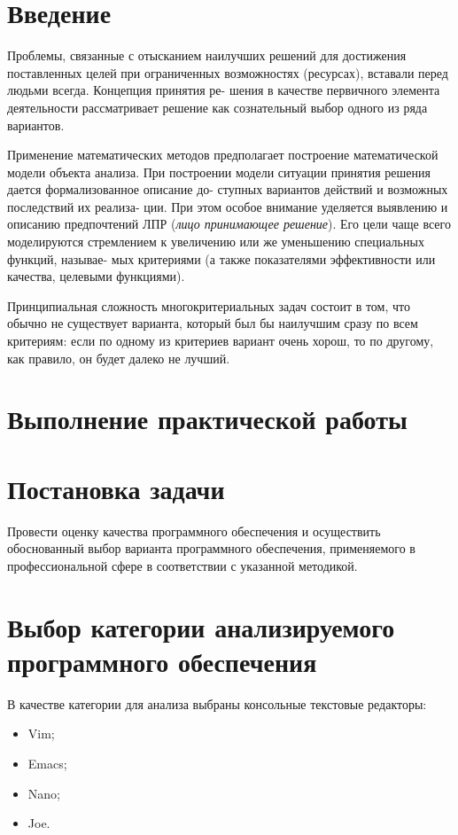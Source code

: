 \graphicspath{{~/Pictures/Screenshots/}} %

\section*{\LARGE Введение}
Проблемы, связанные с отысканием наилучших решений для
достижения поставленных целей при ограниченных возможностях
(ресурсах), вставали перед людьми всегда. Концепция принятия ре-
шения в качестве первичного элемента деятельности рассматривает
решение как сознательный выбор одного из ряда вариантов.\par
Применение математических методов предполагает построение
математической модели объекта анализа. При построении модели
ситуации принятия решения дается формализованное описание до-
ступных вариантов действий и возможных последствий их реализа-
ции. При этом особое внимание уделяется выявлению и описанию
предпочтений ЛПР (\textit{лицо принимающее решение}).
Его цели чаще всего моделируются стремлением
к увеличению или же уменьшению специальных функций, называе-
мых критериями (а также показателями эффективности или качества,
целевыми функциями).\par
Принципиальная сложность многокритериальных задач состоит в
том, что обычно не существует варианта, который был бы наилучшим
сразу по всем критериям: если по одному из критериев вариант очень
хорош, то по другому, как правило, он будет далеко не лучший.

\newpage

\section*{\LARGE Выполнение практической работы}

\section{Постановка задачи}
Провести оценку качества программного обеспечения и осуществить
обоснованный выбор варианта программного обеспечения, применяемого в
профессиональной сфере в соответствии с указанной методикой.

\section[Выбор категорий]{Выбор категории анализируемого программного
	обеспечения}
В качестве категории для анализа выбраны консольные текстовые редакторы:
\begin{itemize}
	\item Vim;
	\item Emacs;
	\item Nano;
	\item Joe.
\end{itemize}

